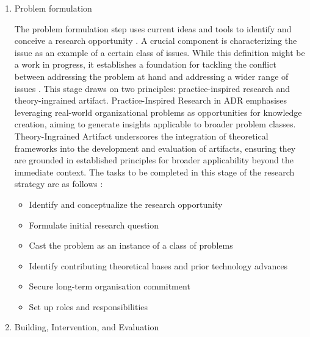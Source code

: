 \par{\begin{enumerate}
        \item Problem formulation
\par{The problem formulation step uses current ideas and tools to identify and conceive a research opportunity \citep{hevner2004design}. A crucial component is characterizing the issue as an example of a certain class of issues. While this definition might be a work in progress, it establishes a foundation for tackling the conflict between addressing the problem at hand and addressing a wider range of issues \citep{sein2011action}. This stage draws on two principles: practice-inspired research and theory-ingrained artifact. Practice-Inspired Research in ADR emphasises leveraging real-world organizational problems as opportunities for knowledge creation, aiming to generate insights applicable to broader problem classes. Theory-Ingrained Artifact underscores the integration of theoretical frameworks into the development and evaluation of artifacts, ensuring they are grounded in established principles for broader applicability beyond the immediate context. The tasks to be completed in this stage of the research strategy are as follows \citep{sein2011action}:}
\begin{itemize}
        \item Identify and conceptualize the research opportunity
        \item Formulate initial research question
        \item Cast the problem as an instance of a class of problems
        \item Identify contributing theoretical bases and prior technology advances
        \item Secure long-term organisation commitment
        \item Set up roles and responsibilities
\end{itemize}
        \item Building, Intervention, and Evaluation

\end{enumerate}}
